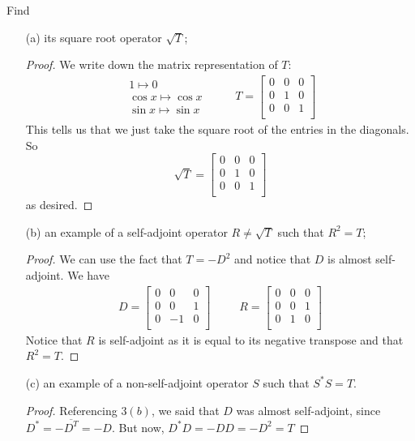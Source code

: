 \documentclass{article}
\begin{document}
Find
\begin{enumerate}
	\item [(a)] its square root operator $\sqrt{T}$;
		\begin{proof}
			We write down the matrix representation of $T$:
			\begin{align*}
				\begin{split}
					1 \mapsto 0 \\
					\cos{x} \mapsto \cos{x} \\
					\sin{x} \mapsto \sin{x}
				\end{split} 
			\hspace{30pt} 
				T = 		
				\begin{bmatrix}
				0 & 0 & 0 \\
				0 & 1 & 0 \\
				0 & 0 & 1 \\
				\end{bmatrix}
			\end{align*}
			This tells us that we just take the square root of the entries in the diagonals. So
			\begin{equation*}
				\sqrt{T} =
				\begin{bmatrix}
				0 & 0 & 0 \\
				0 & 1 & 0 \\
				0 & 0 & 1 \\
				\end{bmatrix}
			\end{equation*}
			as desired.
		\end{proof}

	\item [(b)] an example of a self-adjoint operator $R \neq \sqrt{T}$ such that $R^{2} = T$;
		\begin{proof}
			We can use the fact that $T = -D^{2}$ and notice that $D$ is almost self-adjoint. We have
			\begin{align*}
				D = 
				\begin{bmatrix}
				0 & 0 & 0 \\
				0 & 0 & 1 \\
				0 & -1 & 0 \\
				\end{bmatrix}
			\hspace{30pt} 
				R = 	
				\begin{bmatrix}
				0 & 0 & 0 \\
				0 & 0 & 1 \\
				0 & 1 & 0 \\
				\end{bmatrix}
			\end{align*}
			Notice that $R$ is self-adjoint as it is equal to its negative transpose and that $R^{2} = T$.
		\end{proof}

	\item [(c)] an example of a non-self-adjoint operator $S$ such that $S^{*}S = T$.
		\begin{proof}
			Referencing $3(b)$, we said that $D$ was almost self-adjoint, since $D^{*} = -\overline{D^{T}}= -D$. But now, $D^{*}D = -DD = -D^{2} = T$
		\end{proof}
\end{enumerate}
\end{document}

